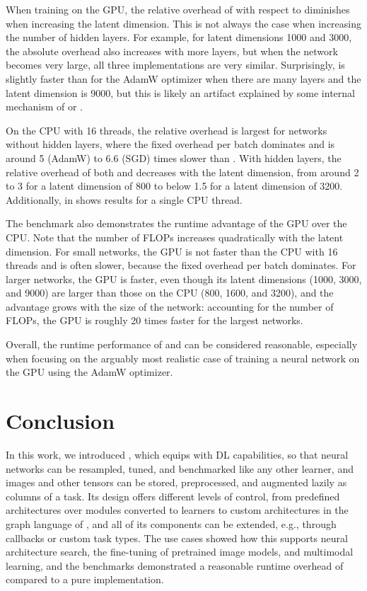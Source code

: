 \documentclass[article,shortnames]{jss}
\theoremstyle{definition}
\begin{document}
When training on the GPU, the relative overhead of \torch{} with respect to \pytorch{} diminishes when increasing the latent dimension.
This is not always the case when increasing the number of hidden layers.
For example, for latent dimensions 1000 and 3000, the absolute overhead also increases with more layers, but when the network becomes very large, all three implementations are very similar.
Surprisingly, \mlrttorch{} is slightly faster than \torch{} for the AdamW optimizer when there are many layers and the latent dimension is 9000, but this is likely an artifact explained by some internal mechanism of \torch{} or \libtorch{}.

On the CPU with 16 threads, the relative overhead is largest for networks without hidden layers, where the fixed overhead per batch dominates and \mlrttorch{} is around 5 (AdamW) to 6.6 (SGD) times slower than \pytorch{}.
With hidden layers, the relative overhead of both \torch{} and \mlrttorch{} decreases with the latent dimension, from around 2 to 3 for a latent dimension of 800 to below 1.5 for a latent dimension of 3200.
Additionally,  in  shows results for a single CPU thread.

The benchmark also demonstrates the runtime advantage of the GPU over the CPU.
Note that the number of FLOPs increases quadratically with the latent dimension.
For small networks, the GPU is not faster than the CPU with 16 threads and is often slower, because the fixed overhead per batch dominates. For larger networks, the GPU is faster, even though its latent dimensions (1000, 3000, and 9000) are larger than those on the CPU (800, 1600, and 3200), and the advantage grows with the size of the network: accounting for the number of FLOPs, the GPU is roughly 20 times faster for the largest networks.

Overall, the runtime performance of \mlrttorch{} and \torch{} can be considered reasonable, especially when focusing on the arguably most realistic case of training a neural network on the GPU using the AdamW optimizer.

\section{Conclusion}\label{sec:conclusion}

In this work, we introduced , which equips  with DL capabilities, so that neural networks can be resampled, tuned, and benchmarked like any other learner, and images and other tensors can be stored, preprocessed, and augmented lazily as columns of a task.
Its design offers different levels of control, from predefined architectures over \torch{} modules converted to learners to custom architectures in the graph language of \mlrtpipelines{}, and all of its components can be extended, e.g., through callbacks or custom task types.
The use cases showed how this supports neural architecture search, the fine-tuning of pretrained image models, and multimodal learning, and the benchmarks demonstrated a reasonable runtime overhead of \mlrttorch{} compared to a pure \torch{} implementation.
\end{document}
